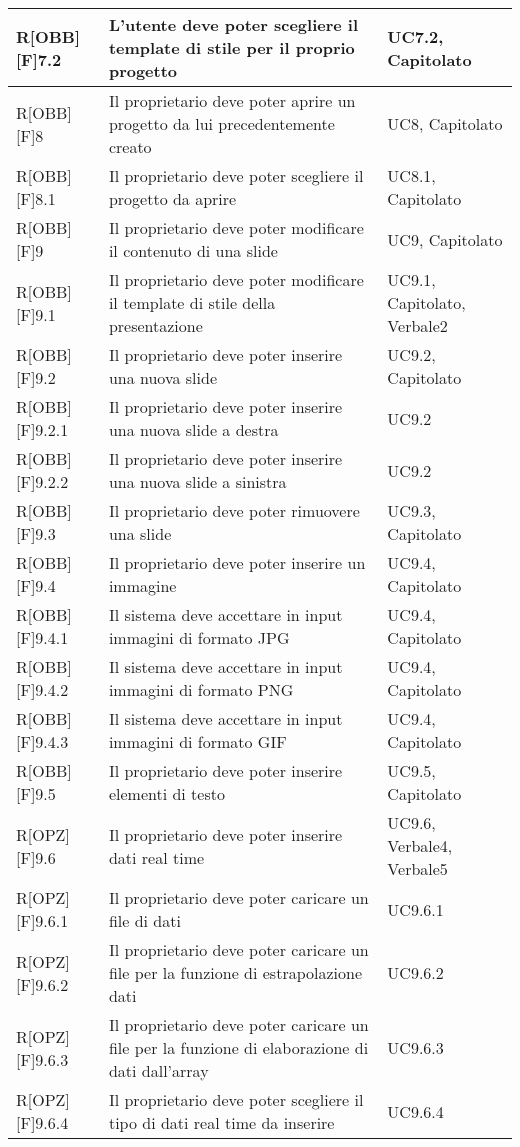 	\newpage
	
	\begin{table}[h]
		\begin{tabular}{|p{}|p{}|p{}|}
			\midrule
			
			R[OBB][F]7.2 & L'utente deve poter scegliere il \gls{template} di stile per il proprio progetto & UC7.2, Capitolato \\ \midrule
			R[OBB][F]8 & Il proprietario deve poter aprire un progetto da lui precedentemente creato & UC8, Capitolato \\ \midrule
			R[OBB][F]8.1 & Il proprietario deve poter scegliere il progetto da aprire & UC8.1, Capitolato \\ \midrule
			R[OBB][F]9 & Il proprietario deve poter modificare il contenuto di una \gls{slide} & UC9, Capitolato \\ \midrule
			R[OBB][F]9.1 & Il proprietario deve poter modificare il \gls{template} di stile della presentazione & UC9.1, Capitolato, Verbale2 \\ \midrule
			R[OBB][F]9.2 & Il proprietario deve poter inserire una nuova \gls{slide} & UC9.2, Capitolato \\ \midrule
			R[OBB][F]9.2.1 & Il proprietario deve poter inserire una nuova \gls{slide} a destra & UC9.2 \\ \midrule
			R[OBB][F]9.2.2 & Il proprietario deve poter inserire una nuova \gls{slide} a sinistra & UC9.2 \\ \midrule
			R[OBB][F]9.3 & Il proprietario deve poter rimuovere una \gls{slide} & UC9.3, Capitolato \\ \midrule
			R[OBB][F]9.4 & Il proprietario deve poter inserire un immagine & UC9.4, Capitolato \\ \midrule
			R[OBB][F]9.4.1 & Il sistema deve accettare in input immagini di formato JPG & UC9.4, Capitolato \\ \midrule
			R[OBB][F]9.4.2 & Il sistema deve accettare in input immagini di formato \gls{PNG} & UC9.4, Capitolato \\ \midrule
			R[OBB][F]9.4.3 & Il sistema deve accettare in input immagini di formato GIF & UC9.4, Capitolato \\ \midrule
			R[OBB][F]9.5 & Il proprietario deve poter inserire elementi di testo & UC9.5, Capitolato \\ \midrule
			R[OPZ][F]9.6 & Il proprietario deve poter inserire dati \gls{real time} & UC9.6, Verbale4, Verbale5 \\ \midrule
			R[OPZ][F]9.6.1 & Il proprietario deve poter caricare un file di dati & UC9.6.1 \\ \midrule
			R[OPZ][F]9.6.2 & Il proprietario deve poter caricare un file per la funzione di estrapolazione dati & UC9.6.2 \\ \midrule
			R[OPZ][F]9.6.3 & Il proprietario deve poter caricare un file per la funzione di elaborazione di dati dall'array & UC9.6.3 \\ \midrule
			R[OPZ][F]9.6.4 & Il proprietario deve poter scegliere il tipo di dati real time da inserire & UC9.6.4 \\ \midrule

		\end{tabular}
	\end{table}
